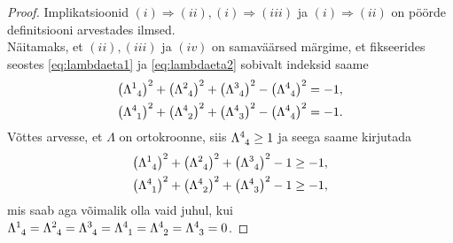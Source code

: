 \documentclass[a4paper,12pt]{article}
\theoremstyle{plain}
\theoremstyle{definition}
\numberwithin{equation}{section}
\begin{document}
\begin{proof}
Implikatsioonid $(i) \Longrightarrow (ii), (i) \Longrightarrow (iii)$ ja $(i) \Longrightarrow (ii)$ on pöörde definitsiooni arvestades ilmsed. \\
Näitamaks, et $(ii), (iii)$ ja $(iv)$ on samaväärsed märgime, et fikseerides seostes \ref{eq:lambdaeta1} ja \ref{eq:lambdaeta2} sobivalt indeksid saame
\begin{align*}
\left(\Lambda\indices{^1_4}\right)^2 + \left(\Lambda\indices{^2_4}\right)^2 + \left(\Lambda\indices{^3_4}\right)^2 - \left(\Lambda\indices{^4_4}\right)^2 = -1, \\
\left(\Lambda\indices{^4_1}\right)^2 + \left(\Lambda\indices{^4_2}\right)^2 + \left(\Lambda\indices{^4_3}\right)^2 - \left(\Lambda\indices{^4_4}\right)^2 = -1.
\end{align*}
Võttes arvesse, et $\Lambda$ on ortokroonne, siis $\Lambda\indices{^4_4} \geq 1$ ja seega saame kirjutada
\begin{align*}
\left(\Lambda\indices{^1_4}\right)^2 + \left(\Lambda\indices{^2_4}\right)^2 + \left(\Lambda\indices{^3_4}\right)^2 - 1 \geq -1, \\
\left(\Lambda\indices{^4_1}\right)^2 + \left(\Lambda\indices{^4_2}\right)^2 + \left(\Lambda\indices{^4_3}\right)^2 - 1 \geq -1,
\end{align*}
mis saab aga võimalik olla vaid juhul, kui $\Lambda\indices{^1_4} = \Lambda\indices{^2_4} = \Lambda\indices{^3_4} = \Lambda\indices{^4_1} = \Lambda\indices{^4_2} = \Lambda\indices{^4_3} = 0$.


\end{proof}
\end{document}
